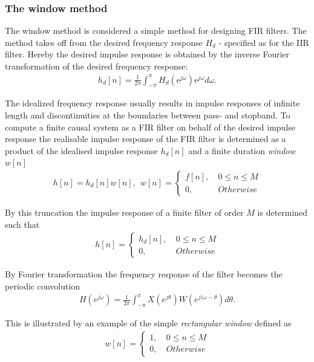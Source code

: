 \subsubsection{The window method}
The window method is considered a simple method for designing FIR filters. The method takes off from the desired frequency response $H_d$ - specified as for the IIR filter. Hereby the desired impulse response is obtained by the inverse Fourier transformation of the desired frequency response:
\begin{align}
h_d[n]=\frac{1}{2\pi}\int_{-\pi}^{\pi} H_d(\text{e}^{j\omega})\text{e}^{j\omega} d\omega.
\end{align}

The idealized frequency response usually results in impulse responses of infinite length and discontinuities at the boundaries between pass- and stopband. To compute a finite causal system as a FIR filter on behalf of the desired impulse response the realisable impulse response of the FIR filter is determined as a product of the idealised impulse response $h_d[n]$ and a finite duration \textit{window} $w[n]$ 
\begin{align}
h[n]=h_d[n]w[n], \ \ w[n] =
\left\{ \begin{matrix}
f[n], &\ 0 \leq n \leq M \\
0, &\ Otherwise
\end{matrix}\right.
\end{align}

By this truncation the impulse response of a finite filter of order $M$ is determined such that
\begin{align}
h[n]= 
\left\{ \begin{matrix}
h_d[n], &\ 0 \leq n \leq M \\
0, &\ Otherwise
\end{matrix}\right.
\end{align}

By Fourier transformation the frequency response of the filter becomes the periodic convolution 
\begin{align}
H(e^{j\omega})=\frac{1}{2\pi}\int_{-\pi}^{\pi} X(e^{j\theta})W(e^{j(\omega-\theta})d\theta.
\end{align}

This is illustrated by an example of the simple \textit{rectangular window} defined as 
\begin{align}
w[n] =
\left\{ \begin{matrix}
1, &\ 0 \leq n \leq M \\
0, &\ Otherwise
\end{matrix}\right.
\end{align}

